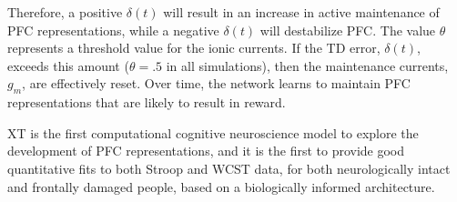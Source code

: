Therefore, a positive \begin{math}\delta(t)\end{math} will result in an increase in active maintenance of PFC representations, while a negative \begin{math}\delta(t)\end{math} will destabilize PFC.  The value \begin{math}\theta\end{math} represents a threshold value for the ionic currents.  If the TD error, \begin{math}\delta(t)\end{math}, exceeds this amount (\begin{math}\theta = .5\end{math} in all simulations), then the maintenance currents, \begin{math}g_m\end{math}, are effectively reset.  Over time, the network learns to maintain PFC representations that are likely to result in reward.  


XT is the first computational cognitive neuroscience model to explore
the development of PFC representations, and it is the first to provide
good quantitative fits to both Stroop and WCST data, for both
neurologically intact and frontally damaged people, based on a biologically informed architecture.



